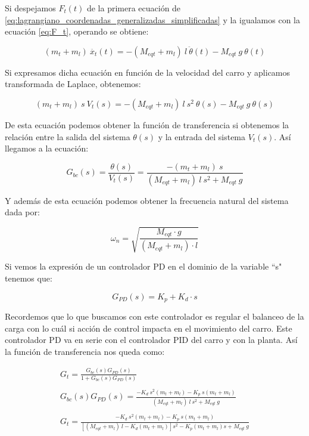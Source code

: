 \documentclass[11pt]{article}
\begin{document}
Si despejamos $F_{t}(t)$ de la primera ecuación de \ref{eq:lagrangiano_coordenadas_generalizadas_simplificadas} y la igualamos con la ecuación \ref{eq:F_t}, operando se obtiene:

\begin{equation}
	\label{eq:F_t_2}
	(m_t+m_l)\ \ddot{x_t}(t)=-(M_{eqt}+m_l)\ l\ \ddot{\theta}(t)-M_{eqt}\ g\ \theta(t)
\end{equation}

Si expresamos dicha ecuación en función de la velocidad del carro y aplicamos transformada de Laplace, obtenemos:

\begin{equation}
	\label{eq:laplace_F_t_2}
	(m_t+m_l)\ s\ V_t(s)=-(M_{eqt}+m_l)\ l\ s^{2}\ \theta(s)-M_{eqt}\ g\ \theta(s)
\end{equation}

De esta ecuación podemos obtener la función de transferencia si obtenemos la relación entre la salida del sistema $\theta(s)$ y la entrada del sistema $V_t(s)$. Así llegamos a la ecuación:

\begin{equation}
	\label{eq:funcion_transferencia}
	G_{bc}(s)=\frac{\theta(s)}{V_t(s)}=\frac{-(m_t+m_l)\ s}{(M_{eqt}+m_l)\ l\ s^{2}+ M_{eqt}\ g}
\end{equation}

Y además de esta ecuación podemos obtener la frecuencia natural del sistema dada por:

\begin{equation}
	\label{eq:frecuencia_natural}
	\omega_{n}=\sqrt{\frac{M_{eqt}\cdot g}{(M_{eqt}+m_l)\cdot l}}
\end{equation}

Si vemos la expresión de un controlador PD en el dominio de la variable ``s" tenemos que:

\begin{equation}
	\label{eq:controlador_PD}
	G_{PD}(s)=K_p+K_d\cdot s
\end{equation}

Recordemos que lo que buscamos con este controlador es regular el balanceo de la carga con lo cuál si acción de control impacta en el movimiento del carro. Este controlador PD va en serie con el controlador PID del carro y con la planta. Así la función de transferencia nos queda como:

\begin{equation}
	\label{eq:funcion_transferencia_controlador}
	\begin{matrix}G_t=\frac{G_{bc}(s)G_{PD}(s)}{1+G_{bc}(s)G_{PD}(s)}\\\\G_{bc}(s)G_{PD}(s)=\frac{-K_d\:s^{2}(m_t+m_l)-K_p\:s(m_t+m_l)}{(M_{eqt}+m_l)\:l\:s^{2}+M_{eqt}\:g}\\ \\G_t=\frac{-K_d\:s^{2}(m_t+m_l)-K_p\:s(m_t+m_l)}{\left [ (M_{eqt}+m_l)\:l-K_d(m_t+m_l) \right ]s^{2}-K_p(m_t+m_l)s+M_{eqt}\:g}\end{matrix}
\end{equation}
\end{document}
